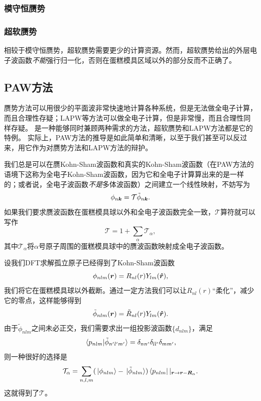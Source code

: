 \subsubsection{模守恒赝势}


\subsubsection{超软赝势}

相较于模守恒赝势，超软赝势需要更少的计算资源。然而，超软赝势给出的外层电子波函数\emph{不能}强行归一化，否则在蛋糕模具区域以外的部分反而不正确了。

\subsection{PAW方法}\label{sec:dft-paw}

赝势方法可以用很少的平面波非常快速地计算各种系统，但是无法做全电子计算，而且合理性存疑；LAPW等方法可以做全电子计算，但是非常慢，而且合理性同样存疑。
是一种能够同时兼顾两种需求的方法，超软赝势和LAPW方法都是它的特例。
实际上，PAW方法的推导是如此简单和清晰，以至于我们甚至可以反过来，用它作为对赝势方法和LAPW方法的辩护。

我们总是可以在赝Kohn-Sham波函数和真实的Kohn-Sham波函数（在PAW方法的语境下这称为全电子Kohn-Sham波函数，因为它和全电子计算算出来的是一样的；或者说，全电子波函数\emph{不是}多体波函数）之间建立一个线性映射，不妨写为
\begin{equation}
    \phi_{n \vb*{k}} = \mathcal{T} \tilde{\phi}_{n \vb*{k}}.
\end{equation}
如果我们要求赝波函数在蛋糕模具球以外和全电子波函数完全一致，$\mathcal{T}$算符就可以写作
\begin{equation}
    \mathcal{T} = 1 + \sum_{\alpha} \mathcal{T}_\alpha,
\end{equation}
其中$\mathcal{T}_\alpha$将$\alpha$号原子周围的蛋糕模具球中的赝波函数映射成全电子波函数。

设我们DFT求解孤立原子已经得到了Kohn-Sham波函数
\begin{equation}
    \phi_{nlm}(\vb*{r}) = R_{nl}(r) Y_{lm}(\vu*{r}),
\end{equation}
我们将它在蛋糕模具球以外截断。通过一定方法我们可以让$R_{nl}(r)$“柔化”，减少它的零点，这样能够得到
\begin{equation}
    \tilde{\phi}_{nlm}(\vb*{r}) = \tilde{R}_{nl}(r) Y_{lm}(\vu*{r}).
\end{equation}
由于$\tilde{\phi}_{nlm}$之间未必正交，我们需要求出一组投影波函数$\{d_{nlm}\}$，满足
\begin{equation}
    \braket*{p_{nlm}}{\tilde{\phi}_{n' l' m'}} = \delta_{n n'} \delta_{l l'} \delta_{m m'},
\end{equation}
则一种很好的选择是
\begin{equation}
    \mathcal{T}_\alpha = \sum_{n, l, m} (\ket*{\phi_{nlm}} - \ket*{\tilde{\phi}_{nlm}}) \bra{p_{nlm}} |_{\vb*{r} \to \vb*{r} - \vb*{R}_\alpha}.
\end{equation}
这就得到了$\mathcal{T}$。

